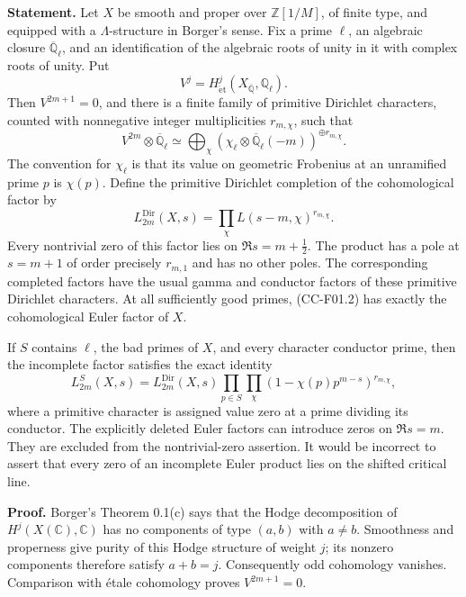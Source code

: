 \textbf{Statement.} Let \(X\) be smooth and proper over
\(\mathbb Z[1/M]\), of finite type, and equipped with a
\(\Lambda\)-structure in Borger's sense. Fix a prime \(\ell\), an
algebraic closure \(\overline{\mathbb Q}_\ell\), and an identification
of the algebraic roots of unity in it with complex roots of unity. Put
\[
 V^j=H^j_{\mathrm{\acute et}}(X_{\overline{\mathbb Q}},\mathbb Q_\ell).
\] Then \(V^{2m+1}=0\), and there is a finite family of primitive
Dirichlet characters, counted with nonnegative integer multiplicities
\(r_{m,\chi}\), such that \[
 V^{2m}\otimes\overline{\mathbb Q}_\ell
 \simeq\bigoplus_\chi(\chi_\ell\otimes\overline{\mathbb Q}_\ell(-m))^{\oplus r_{m,\chi}}.
 \tag{CC-F01.1}
\] The convention for \(\chi_\ell\) is that its value on geometric
Frobenius at an unramified prime \(p\) is \(\chi(p)\). Define the
primitive Dirichlet completion of the cohomological factor by \[
 L^{\mathrm{Dir}}_{2m}(X,s)=\prod_\chi L(s-m,\chi)^{r_{m,\chi}}.
 \tag{CC-F01.2}
\] Every nontrivial zero of this factor lies on \(\Re s=m+\tfrac12\).
The product has a pole at \(s=m+1\) of order precisely \(r_{m,1}\) and
has no other poles. The corresponding completed factors have the usual
gamma and conductor factors of these primitive Dirichlet characters. At
all sufficiently good primes, (CC-F01.2) has exactly the cohomological
Euler factor of \(X\).

If \(S\) contains \(\ell\), the bad primes of \(X\), and every character
conductor prime, then the incomplete factor satisfies the exact identity
\[
 L^S_{2m}(X,s)
 =L^{\mathrm{Dir}}_{2m}(X,s)
   \prod_{p\in S}\prod_\chi
       (1-\chi(p)p^{m-s})^{r_{m,\chi}},
 \tag{CC-F01.3}
\] where a primitive character is assigned value zero at a prime
dividing its conductor. The explicitly deleted Euler factors can
introduce zeros on \(\Re s=m\). They are excluded from the
nontrivial-zero assertion. It would be incorrect to assert that every
zero of an incomplete Euler product lies on the shifted critical line.

\textbf{Proof.} Borger's Theorem 0.1(c) says that the Hodge
decomposition of \(H^j(X(\mathbb C),\mathbb C)\) has no components of
type \((a,b)\) with \(a\ne b\). Smoothness and properness give purity of
this Hodge structure of weight \(j\); its nonzero components therefore
satisfy \(a+b=j\). Consequently odd cohomology vanishes. Comparison with
étale cohomology proves \(V^{2m+1}=0\).

